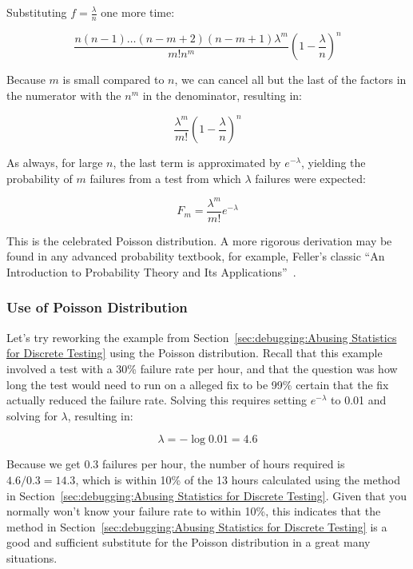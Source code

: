 Substituting $f=\frac{\lambda}{n}$ one more time:

\begin{equation}
	\frac{n(n-1)\dots(n-m+2)(n-m+1)\lambda^m}{m!n^m}(1 - \frac{\lambda}{n})^n
\end{equation}

Because $m$ is small compared to $n$, we can cancel all but the last of
the factors in
the numerator with the $n^m$ in the denominator, resulting in:

\begin{equation}
	\frac{\lambda^m}{m!}(1 - \frac{\lambda}{n})^n
\end{equation}

As always, for large $n$, the last term is approximated by $e^{-\lambda}$,
yielding the probability of $m$ failures from a test from which
$\lambda$ failures were expected:

\begin{equation}
	F_m = \frac{\lambda^m}{m!} e^{-\lambda}
\label{eq:debugging:Poisson Probability}
\end{equation}

This is the celebrated Poisson distribution.
A more rigorous derivation may be found in any advanced probability
textbook, for example, Feller's classic ``An Introduction to Probability
Theory and Its Applications''~\cite{Feller58}.

\subsubsection{Use of Poisson Distribution}
\label{sec:debugging:Use of Poisson Distribution}

Let's try reworking the example from
Section~\ref{sec:debugging:Abusing Statistics for Discrete Testing}
using the Poisson distribution.
Recall that this example involved a test with a 30\% failure rate per
hour, and that the question was how long the test would need to run
on a alleged fix to be 99\% certain that the fix actually reduced the
failure rate.
Solving this requires setting $e^{-\lambda}$
to 0.01 and solving for $\lambda$, resulting in:

\begin{equation}
	\lambda = - \log 0.01 = 4.6
\end{equation}

Because we get $0.3$ failures per hour, the number of hours required
is $4.6/0.3 = 14.3$, which is within 10\% of the 13 hours
calculated using the method in
Section~\ref{sec:debugging:Abusing Statistics for Discrete Testing}.
Given that you normally won't know your failure rate to within 10\%,
this indicates that the method in
Section~\ref{sec:debugging:Abusing Statistics for Discrete Testing}
is a good and sufficient substitute for the Poisson distribution in
a great many situations.


